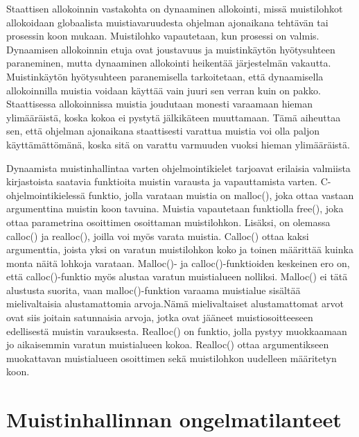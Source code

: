 Staattisen allokoinnin vastakohta on dynaaminen allokointi, missä muistilohkot allokoidaan globaalista muistiavaruudesta ohjelman ajonaikana tehtävän tai prosessin koon mukaan. Muistilohko vapautetaan, kun prosessi on valmis. Dynaamisen allokoinnin etuja ovat joustavuus ja muistinkäytön hyötysuhteen paraneminen, mutta dynaaminen allokointi heikentää järjestelmän vakautta.\cite{daroemmfera@2006} Muistinkäytön hyötysuhteen paranemisella tarkoitetaan, että dynaamisella allokoinnilla muistia voidaan käyttää vain juuri sen verran kuin on pakko. Staattisessa allokoinnissa muistia joudutaan monesti varaamaan hieman ylimääräistä, koska kokoa ei pystytä jälkikäteen muuttamaan. Tämä aiheuttaa sen, että ohjelman ajonaikana staattisesti varattua muistia voi olla paljon käyttämättömänä, koska sitä on varattu varmuuden vuoksi hieman ylimääräistä.

Dynaamista muistinhallintaa varten ohjelmointikielet tarjoavat erilaisia valmiista kirjastoista saatavia funktioita muistin varausta ja vapauttamista varten. C-ohjelmointikielessä funktio, jolla varataan muistia on malloc(), joka ottaa vastaan argumenttina muistin koon tavuina. Muistia vapautetaan funktiolla free(), joka ottaa parametrina osoittimen osoittaman muistilohkon. Lisäksi, on olemassa calloc() ja realloc(), joilla voi myös varata muistia. Calloc() ottaa kaksi argumenttia, joista yksi on varatun muistilohkon koko ja toinen määrittää kuinka monta näitä lohkoja varataan. Malloc()- ja calloc()-funktioiden keskeinen ero on, että calloc()-funktio myös alustaa varatun muistialueen nolliksi. Malloc() ei tätä alustusta suorita, vaan malloc()-funktion varaama muistialue sisältää mielivaltaisia alustamattomia arvoja.\cite{c2015book}Nämä mielivaltaiset alustamattomat arvot ovat siis joitain satunnaisia arvoja, jotka ovat jääneet muistiosoitteeseen edellisestä muistin varauksesta. Realloc() on funktio, jolla pystyy muokkaamaan jo aikaisemmin varatun muistialueen kokoa. Realloc() ottaa argumentikseen muokattavan muistialueen osoittimen sekä muistilohkon uudelleen määritetyn koon.\cite{c2015book}

\section{Muistinhallinnan ongelmatilanteet}

